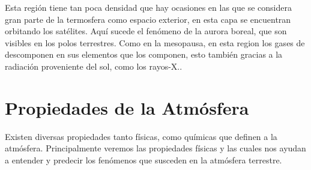 \documentclass[12pt]{article}
\begin{document}
    Esta región tiene tan poca densidad que hay ocasiones en las que se considera gran parte de la termosfera como espacio exterior, en esta capa se encuentran orbitando los satélites. Aquí sucede el fenómeno de la aurora boreal, que son visibles en los polos terrestres.
    Como en la mesopausa, en esta region los gases de descomponen en sus elementos que los componen, esto también gracias a la radiación proveniente del sol, como los rayos-X.\cite{termo}.
    
\newpage
\section{Propiedades de la Atmósfera}
Existen diversas propiedades tanto físicas, como químicas que definen a la atmósfera. Principalmente veremos las propiedades físicas y las cuales nos ayudan a entender y predecir los fenómenos que susceden en la atmósfera terrestre.
\end{document}
